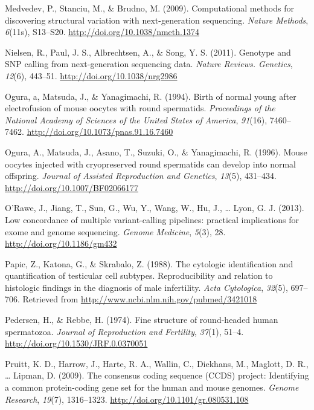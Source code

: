 \documentclass[12pt,twoside]{reedthesis}
\theoremstyle{definition}
\theoremstyle{definition}
\theoremstyle{remark}
\begin{document}
  \hypertarget{ref-Medvedev2009}{}
  Medvedev, P., Stanciu, M., \& Brudno, M. (2009). Computational methods
  for discovering structural variation with next-generation sequencing.
  \emph{Nature Methods}, \emph{6}(11s), S13--S20.
  \url{http://doi.org/10.1038/nmeth.1374}
  
  \hypertarget{ref-Nielsen2011}{}
  Nielsen, R., Paul, J. S., Albrechtsen, A., \& Song, Y. S. (2011).
  Genotype and SNP calling from next-generation sequencing data.
  \emph{Nature Reviews. Genetics}, \emph{12}(6), 443--51.
  \url{http://doi.org/10.1038/nrg2986}
  
  \hypertarget{ref-Ogura1994}{}
  Ogura, a, Matsuda, J., \& Yanagimachi, R. (1994). Birth of normal young
  after electrofusion of mouse oocytes with round spermatids.
  \emph{Proceedings of the National Academy of Sciences of the United
  States of America}, \emph{91}(16), 7460--7462.
  \url{http://doi.org/10.1073/pnas.91.16.7460}
  
  \hypertarget{ref-Kimura1995}{}
  Ogura, A., Matsuda, J., Asano, T., Suzuki, O., \& Yanagimachi, R.
  (1996). Mouse oocytes injected with cryopreserved round spermatids can
  develop into normal offspring. \emph{Journal of Assisted Reproduction
  and Genetics}, \emph{13}(5), 431--434.
  \url{http://doi.org/10.1007/BF02066177}
  
  \hypertarget{ref-ORawe2013}{}
  O'Rawe, J., Jiang, T., Sun, G., Wu, Y., Wang, W., Hu, J., \ldots{} Lyon,
  G. J. (2013). Low concordance of multiple variant-calling pipelines:
  practical implications for exome and genome sequencing. \emph{Genome
  Medicine}, \emph{5}(3), 28. \url{http://doi.org/10.1186/gm432}
  
  \hypertarget{ref-Papic}{}
  Papic, Z., Katona, G., \& Skrabalo, Z. (1988). The cytologic
  identification and quantification of testicular cell subtypes.
  Reproducibility and relation to histologic findings in the diagnosis of
  male infertility. \emph{Acta Cytologica}, \emph{32}(5), 697--706.
  Retrieved from \url{http://www.ncbi.nlm.nih.gov/pubmed/3421018}
  
  \hypertarget{ref-Pedersen1974}{}
  Pedersen, H., \& Rebbe, H. (1974). Fine structure of round-headed human
  spermatozoa. \emph{Journal of Reproduction and Fertility}, \emph{37}(1),
  51--4. \url{http://doi.org/10.1530/JRF.0.0370051}
  
  \hypertarget{ref-Pruitt2009}{}
  Pruitt, K. D., Harrow, J., Harte, R. A., Wallin, C., Diekhans, M.,
  Maglott, D. R., \ldots{} Lipman, D. (2009). The consensus coding
  sequence (CCDS) project: Identifying a common protein-coding gene set
  for the human and mouse genomes. \emph{Genome Research}, \emph{19}(7),
  1316--1323. \url{http://doi.org/10.1101/gr.080531.108}
  
\end{document}

